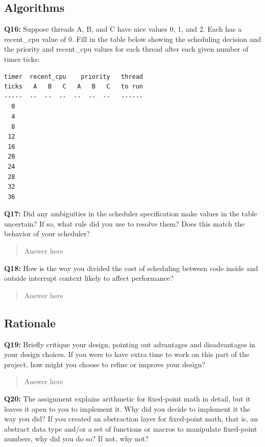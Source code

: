 \documentclass[a4paper,11pt]{paper}
\begin{document}
\subsection{Algorithms}

\textbf{Q16:} Suppose threads A, B, and C have nice values 0, 1, and 2.  Each
has a recent\_cpu value of 0.  Fill in the table below showing the scheduling
decision and the priority and recent\_cpu values for each thread after each
given number of timer ticks:

\small
\begin{Verbatim}[frame=single]
timer  recent_cpu    priority   thread
ticks   A   B   C   A   B   C   to run
-----  --  --  --  --  --  --   ------
  0
  4
  8
 12
 16
 20
 24
 28
 32
 36
\end{Verbatim}


\textbf{Q17:} Did any ambiguities in the scheduler specification make values in
the table uncertain?  If so, what rule did you use to resolve them?  Does this
match the behavior of your scheduler?

\begin{quote}
  Answer here
\end{quote}


\textbf{Q18:} How is the way you divided the cost of scheduling between code
inside and outside interrupt context likely to affect performance?

\begin{quote}
  Answer here
\end{quote}

\subsection{Rationale}

\textbf{Q19:} Briefly critique your design, pointing out advantages and
disadvantages in your design choices.  If you were to have extra time to work on
this part of the project, how might you choose to refine or improve your design?

\begin{quote}
  Answer here
\end{quote}

\textbf{Q20:} The assignment explains arithmetic for fixed-point math in detail,
but it leaves it open to you to implement it.  Why did you decide to implement
it the way you did?  If you created an abstraction layer for fixed-point math,
that is, an abstract data type and/or a set of functions or macros to manipulate
fixed-point numbers, why did you do so?  If not, why not?
\end{document}
